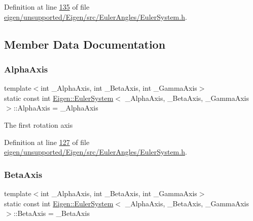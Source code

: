 Definition at line \hyperlink{eigen_2unsupported_2_eigen_2src_2_euler_angles_2_euler_system_8h_source_l00135}{135} of file \hyperlink{eigen_2unsupported_2_eigen_2src_2_euler_angles_2_euler_system_8h_source}{eigen/unsupported/\+Eigen/src/\+Euler\+Angles/\+Euler\+System.\+h}.



\subsection{Member Data Documentation}
\mbox{\label{class_eigen_1_1_euler_system_a9a34f6b38d6ca01d5f1ad3e392403e8e}} 
\subsubsection{\texorpdfstring{Alpha\+Axis}{AlphaAxis}}
{\footnotesize\ttfamily template$<$int \+\_\+\+Alpha\+Axis, int \+\_\+\+Beta\+Axis, int \+\_\+\+Gamma\+Axis$>$ \\
static const int \hyperlink{class_eigen_1_1_euler_system}{Eigen\+::\+Euler\+System}$<$ \+\_\+\+Alpha\+Axis, \+\_\+\+Beta\+Axis, \+\_\+\+Gamma\+Axis $>$\+::Alpha\+Axis = \+\_\+\+Alpha\+Axis\hspace{0.3cm}{\ttfamily [static]}}

The first rotation axis 

Definition at line \hyperlink{eigen_2unsupported_2_eigen_2src_2_euler_angles_2_euler_system_8h_source_l00127}{127} of file \hyperlink{eigen_2unsupported_2_eigen_2src_2_euler_angles_2_euler_system_8h_source}{eigen/unsupported/\+Eigen/src/\+Euler\+Angles/\+Euler\+System.\+h}.

\mbox{\label{class_eigen_1_1_euler_system_ae350fd346a9ed3c1b03ba1bcf0316ffa}} 
\subsubsection{\texorpdfstring{Beta\+Axis}{BetaAxis}}
{\footnotesize\ttfamily template$<$int \+\_\+\+Alpha\+Axis, int \+\_\+\+Beta\+Axis, int \+\_\+\+Gamma\+Axis$>$ \\
static const int \hyperlink{class_eigen_1_1_euler_system}{Eigen\+::\+Euler\+System}$<$ \+\_\+\+Alpha\+Axis, \+\_\+\+Beta\+Axis, \+\_\+\+Gamma\+Axis $>$\+::Beta\+Axis = \+\_\+\+Beta\+Axis\hspace{0.3cm}{\ttfamily [static]}}


